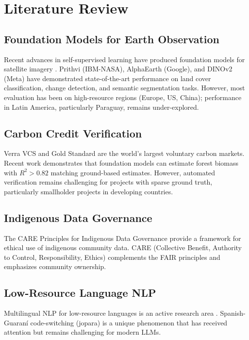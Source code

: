 
\chapter{Literature Review}

\section{Foundation Models for Earth Observation}

Recent advances in self-supervised learning have produced foundation models
for satellite imagery \citep{jakubik2023foundation, satmae2024}. Prithvi
(IBM-NASA), AlphaEarth (Google), and DINOv2 (Meta) have demonstrated
state-of-the-art performance on land cover classification, change detection,
and semantic segmentation tasks. However, most evaluation has been on
high-resource regions (Europe, US, China); performance in Latin America,
particularly Paraguay, remains under-explored.

\section{Carbon Credit Verification}

Verra VCS \citep{verra2024} and Gold Standard \citep{goldstandard2024} are the
world's largest voluntary carbon markets. Recent work \citep{lamahewage2026alphaearth}
demonstrates that foundation models can estimate forest biomass with
$R^2 > 0.82$ matching ground-based estimates. However, automated verification
remains challenging for projects with sparse ground truth, particularly
smallholder projects in developing countries.

\section{Indigenous Data Governance}

The CARE Principles for Indigenous Data Governance \citep{carroll2020care}
provide a framework for ethical use of indigenous community data. CARE
(Collective Benefit, Authority to Control, Responsibility, Ethics)
complements the FAIR principles and emphasizes community ownership.

\section{Low-Resource Language NLP}

Multilingual NLP for low-resource languages is an active research area
\citep{aguerotorales2023jopara, chiruzzo2023guaspa, kellert2025spanish}.
Spanish-Guaraní code-switching (jopara) is a unique phenomenon that has
received attention \citep{mozillacv2024} but remains challenging for
modern LLMs.

